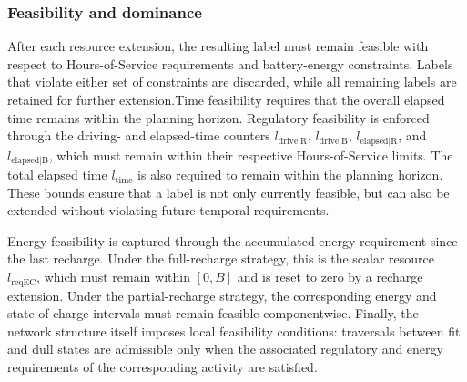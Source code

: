 \documentclass[3p,11pt,authoryear]{elsarticle}  %
\begin{document}

\subsubsection{Feasibility and dominance}

After each resource extension, the resulting label must remain feasible with respect to Hours-of-Service requirements and battery-energy constraints. Labels that violate either set of constraints are discarded, while all remaining labels are retained for further extension.Time feasibility requires that the overall elapsed time remains within the planning horizon. Regulatory feasibility is enforced through the driving- and elapsed-time counters
\(l_{\text{drive|R}}\), \(l_{\text{drive|B}}\),
\(l_{\text{elapsed|R}}\), and \(l_{\text{elapsed|B}}\), which must remain within their respective Hours-of-Service limits. The total elapsed time \(l_{\text{time}}\) is also required to remain within the planning horizon. These bounds ensure that a label is not only currently feasible, but can also be extended without violating future temporal requirements.

Energy feasibility is captured through the accumulated energy requirement since the last recharge. Under the full-recharge strategy, this is the scalar resource \(l_{\text{reqEC}}\), which must remain within \([0,B]\) and is reset to zero by a recharge extension. Under the partial-recharge strategy, the corresponding energy and state-of-charge intervals must remain feasible componentwise. Finally, the network structure itself imposes local feasibility conditions: traversals between fit and dull states are admissible only when the associated regulatory and energy requirements of the corresponding activity are satisfied.
\end{document}
